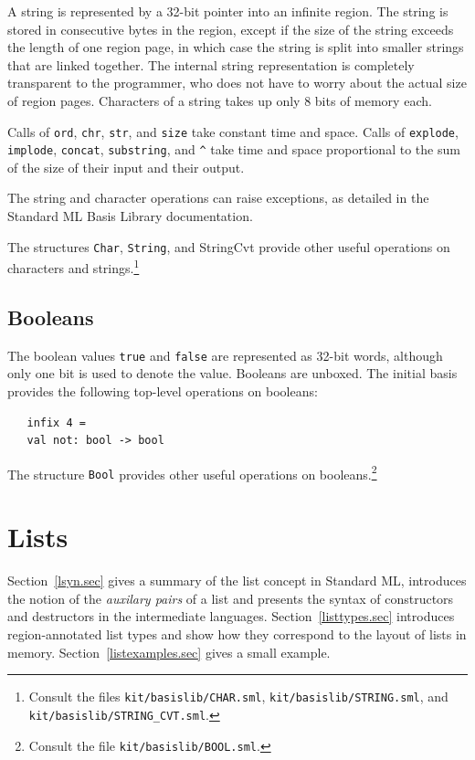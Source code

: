 \documentclass[12pt]{book}
\begin{document}
A string is represented by a 32-bit pointer into an infinite region.
The string is stored in consecutive bytes in the region, except if the
size of the string exceeds the length of one region page, in which
case the string is split into smaller strings that are linked
together. The internal string representation is completely transparent
to the programmer, who does not have to worry about the actual size of
region pages. Characters of a string takes up only 8 bits of
memory each.

Calls of {\tt ord}, {\tt chr}, {\tt str}, and {\tt size} take constant
time and space.  Calls of {\tt explode}, {\tt implode}, {\tt concat},
{\tt substring}, and \verb+^+ take time and space proportional to the
sum of the size of their input and their output.

The string and character operations can raise exceptions, as detailed in the
Standard ML Basis Library documentation.

The structures {\tt Char}, {\tt String}, and {StringCvt} provide other
useful operations on characters and strings.\footnote{Consult the
  files {\tt kit/basislib/CHAR.sml}, {\tt kit/basislib/STRING.sml},
  and {\tt kit/basislib/STRING\_CVT.sml}.}

\section{Booleans}
The boolean values {\tt true} and {\tt false} are represented as
32-bit words, although only one bit is used to denote the value.
Booleans are unboxed. The 
%
initial basis provides the following top-level operations on
booleans:
%
%
\begin{verbatim}
   infix 4 =
   val not: bool -> bool
\end{verbatim}
The structure {\tt Bool} provides other useful operations on
booleans.\footnote{Consult the file {\tt kit/basislib/BOOL.sml}.}

\chapter{Lists}
\label{lists.sec}
Section~\ref{lsyn.sec} gives a summary of the list concept in Standard
ML, introduces the notion of the {\em auxilary pairs} of a list and
presents the syntax of constructors and destructors in the
intermediate languages.  Section~\ref{listtypes.sec} introduces
region-annotated list types and show how they correspond to the layout
of lists in memory.  Section~\ref{listexamples.sec} gives a small
example.
\end{document}
